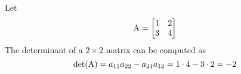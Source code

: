\begin{example}
    Let
    $$
        \mathrm{A} = \left[\begin{matrix}
        1 & 2 \\
        3 & 4
        \end{matrix}\right]
    $$
    The determinant of a $2 \times 2$ matrix can be computed as
    $$ \mathrm{det}{(\mathrm{A})} = a_{11}a_{22} - a_{21}a_{12} = 1 \cdot 4 - 3 \cdot 2 = -2 $$
\end{example}